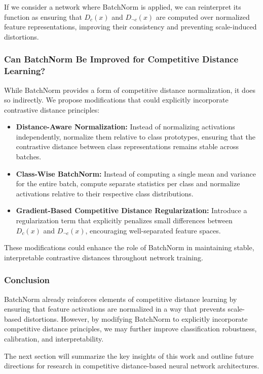 \documentclass[12pt]{article}
\begin{document}
If we consider a network where BatchNorm is applied, we can reinterpret its function as ensuring that \( D_c(x) \) and \( D_{\neg c}(x) \) are computed over normalized feature representations, improving their consistency and preventing scale-induced distortions.

\subsubsection{Can BatchNorm Be Improved for Competitive Distance Learning?}

While BatchNorm provides a form of competitive distance normalization, it does so indirectly. We propose modifications that could explicitly incorporate contrastive distance principles:

\begin{itemize}
    \item \textbf{Distance-Aware Normalization:} Instead of normalizing activations independently, normalize them relative to class prototypes, ensuring that the contrastive distance between class representations remains stable across batches.
    \item \textbf{Class-Wise BatchNorm:} Instead of computing a single mean and variance for the entire batch, compute separate statistics per class and normalize activations relative to their respective class distributions.
    \item \textbf{Gradient-Based Competitive Distance Regularization:} Introduce a regularization term that explicitly penalizes small differences between \( D_c(x) \) and \( D_{\neg c}(x) \), encouraging well-separated feature spaces.
\end{itemize}

These modifications could enhance the role of BatchNorm in maintaining stable, interpretable contrastive distances throughout network training.

\subsubsection{Conclusion}

BatchNorm already reinforces elements of competitive distance learning by ensuring that feature activations are normalized in a way that prevents scale-based distortions. However, by modifying BatchNorm to explicitly incorporate competitive distance principles, we may further improve classification robustness, calibration, and interpretability. 

The next section will summarize the key insights of this work and outline future directions for research in competitive distance-based neural network architectures.
\end{document}
